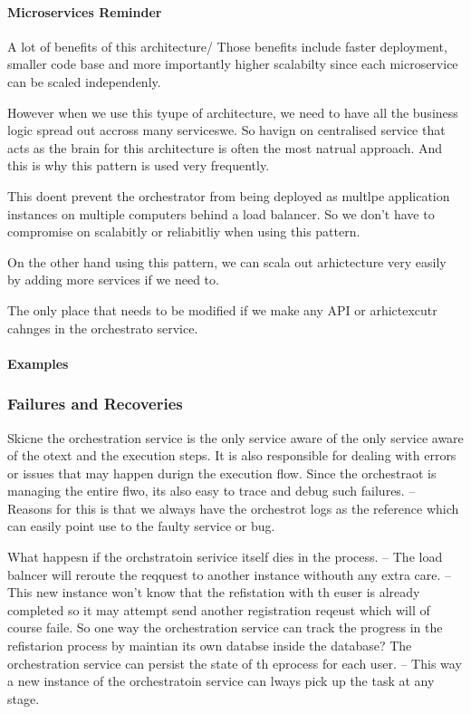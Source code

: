 \documentclass[a4paper, 11pt]{book}
\begin{document}
    \paragraph{Microservices Reminder}
    A lot of benefits of this architecture/
    Those benefits include faster deployment, smaller code base and more importantly higher scalabilty since each microservice can be scaled independenly.

    However when we use this tyupe of architecture, we need to have all the business logic spread out accross many serviceswe.
    So havign on centralised service that acts as the brain for this architecture is often the most natrual approach.
    And this is why this pattern is used very frequently.

    This doent prevent the orchestrator from being deployed as multlpe application instances on multiple computers behind a load balancer.
    So we don't have to compromise on scalabitly or reliabitliy when using this pattern.

    On the other hand using this pattern, we can scala out arhictecture very easily by adding more services if we need to.

    The only place that needs to be modified if we make any API or arhictexcutr cahnges in the orchestrato service.

    \paragraph{Examples}

    \subsubsection{Failures and Recoveries}
    Skicne the orchestration service is the only service aware of the only service aware of the otext and the execution steps.
    It is also responsible for dealing with errors or issues that may happen durign the execution flow.
    Since the orchestraot is managing the entire flwo, its also easy to trace and debug such failures.
    -- Reasons for this is that we always have the orchestrot logs as the reference which can easily point use to the faulty service or bug.

    What happesn if the orchstratoin serivice itself dies in the process.
    -- The load balncer will reroute the reqquest to another instance withouth any extra care.
    -- This new instance won't know that the refistation with th euser is already completed so it may attempt send another registration reqeust which will of course faile.
    So one way the orchestration service can track the progress in the refistarion process by maintian its own databse inside the database?
    The orchestration service can persist the state of th eprocess for each user.
    -- This way a new instance of the orchestratoin service can lways pick up the task at any stage.
\end{document}
